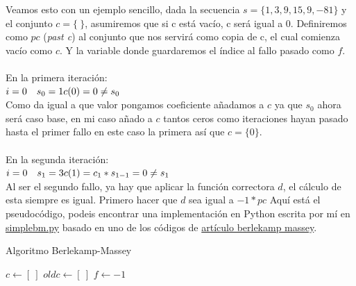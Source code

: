Veamos esto con un ejemplo sencillo, dada la secuencia $s = \{ 1, 3, 9, 15, 9, -81 \}$ y el conjunto $c = \{ \ \}$, asumiremos que si c está vacío, c será igual a 0. Definiremos como $pc$ (\textit{past c}) al conjunto que nos servirá como copia de c, el cual comienza vacío como $c$. Y la variable donde guardaremos el índice al fallo pasado como $f$.
\\\\
En la primera iteración: \\
\(i=0 \quad s_0 = 1 \\
c(0) = 0 \neq s_0\\
\)\\
Como da igual a que valor pongamos coeficiente añadamos a $c$ ya que $s_0$ ahora será caso base, en mi caso añado a $c$ tantos ceros como iteraciones hayan pasado hasta el primer fallo en este caso la primera así que $c = \{ 0 \}$.
\\\\
En la segunda iteración: \\
\(i=0 \quad s_1 = 3 \\
c(1) = c_1 * s_{1-1} = 0 \neq s_1\\
\)\\
Al ser el segundo fallo, ya hay que aplicar la función correctora $d$, el cálculo de esta siempre es igual. Primero hacer que $d$ sea igual a $-1 * pc$
Aquí está el pseudocódigo, podeis encontrar una implementación en Python escrita por mí en \href{https://github.com/domingoUnican/TFGPedroCastro/blob/main/code/code_proofs/simple_berlekamp_massey.py}{simplebm.py} basado en uno de los códigos de \href{https://mzhang2021.github.io/cp-blog/berlekamp-massey/}{artículo berlekamp massey}.



\begin{algorithm}
\caption{Algoritmo Berlekamp-Massey}\label{alg:two}
$c \gets [ \ ]$\;
$oldc \gets [ \ ]$\;
$f \gets -1$\;
\end{algorithm}



